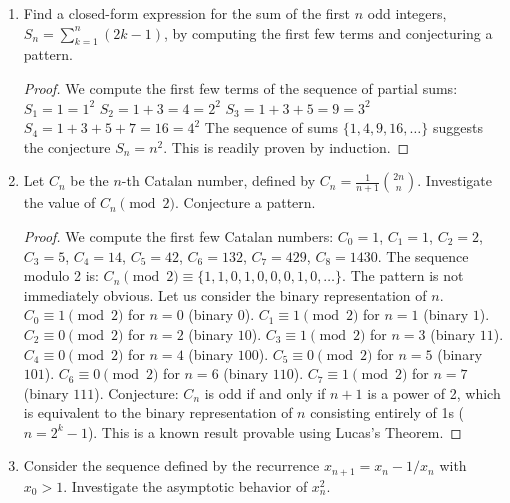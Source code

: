 \begin{enumerate}
    \item {} Find a closed-form expression for the sum of the first $n$ odd integers, $S_n = \sum_{k=1}^{n} (2k-1)$, by computing the first few terms and conjecturing a pattern.

    \begin{proof}
    We compute the first few terms of the sequence of partial sums:
    $S_1 = 1 = 1^2$
    $S_2 = 1+3 = 4 = 2^2$
    $S_3 = 1+3+5 = 9 = 3^2$
    $S_4 = 1+3+5+7 = 16 = 4^2$
    The sequence of sums $\{1, 4, 9, 16, \dots\}$ suggests the conjecture $S_n = n^2$. This is readily proven by induction.
    \end{proof}

    \item {} Let $C_n$ be the $n$-th Catalan number, defined by $C_n = \frac{1}{n+1}\binom{2n}{n}$. Investigate the value of $C_n \pmod 2$. Conjecture a pattern.

    \begin{proof}
    We compute the first few Catalan numbers:
    $C_0=1$, $C_1=1$, $C_2=2$, $C_3=5$, $C_4=14$, $C_5=42$, $C_6=132$, $C_7=429$, $C_8=1430$.
    The sequence modulo 2 is:
    $C_n \pmod 2 \equiv \{1, 1, 0, 1, 0, 0, 0, 1, 0, \dots\}$.
    The pattern is not immediately obvious. Let us consider the binary representation of $n$.
    $C_0 \equiv 1 \pmod 2$ for $n=0$ (binary $0$).
    $C_1 \equiv 1 \pmod 2$ for $n=1$ (binary $1$).
    $C_2 \equiv 0 \pmod 2$ for $n=2$ (binary $10$).
    $C_3 \equiv 1 \pmod 2$ for $n=3$ (binary $11$).
    $C_4 \equiv 0 \pmod 2$ for $n=4$ (binary $100$).
    $C_5 \equiv 0 \pmod 2$ for $n=5$ (binary $101$).
    $C_6 \equiv 0 \pmod 2$ for $n=6$ (binary $110$).
    $C_7 \equiv 1 \pmod 2$ for $n=7$ (binary $111$).
    Conjecture: $C_n$ is odd if and only if $n+1$ is a power of 2, which is equivalent to the binary representation of $n$ consisting entirely of 1s ($n=2^k-1$). This is a known result provable using Lucas's Theorem.
    \end{proof}
    
    \item {} Consider the sequence defined by the recurrence $x_{n+1} = x_n - 1/x_n$ with $x_0 > 1$. Investigate the asymptotic behavior of $x_n^2$.
    

\end{enumerate}
